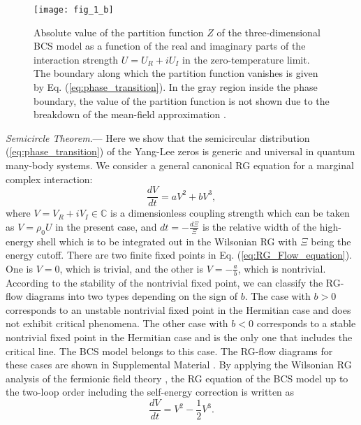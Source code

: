\documentclass[aps,prl,twocolumn,superscriptaddress]{revtex4-1}
\begin{document}
\begin{figure}
\texttt{[image: fig\_1\_b]}

\caption{Absolute value of the partition function $Z$ of the three-dimensional
BCS model as a function of the real and imaginary parts of the interaction
strength $U=U_{R}+iU_{I}$ in the zero-temperature limit. The boundary
along which the partition function vanishes is given by Eq. (\ref{eq:phase_transition}). In the gray region inside
the phase boundary, the value of the partition function is not shown
due to the breakdown of the mean-field approximation \cite{Yamamoto2019}.}

\label{Phase_transition_line}
\end{figure}

\emph{Semicircle Theorem}.---  Here we show that the semicircular
distribution (\ref{eq:phase_transition}) of the Yang-Lee zeros is generic and universal in quantum many-body systems.
We consider a general canonical RG equation for a marginal
complex interaction: 
\begin{equation}
\frac{dV}{dt}=aV^{2}+bV^{3},\label{eq:RG_Flow_equation}
\end{equation}
where $V=V_{R}+iV_{I}\in\mathbb{C}$ is a dimensionless coupling strength
which can be taken as $V=\rho_{0}U$ in the present case, and $dt=-\frac{d\Xi}{\Xi}$
is the relative width of the high-energy shell which is to be integrated out in the Wilsonian RG with $\Xi$ being the energy cutoff. There are two finite fixed points in Eq. (\ref{eq:RG_Flow_equation}). One is $V=0$, which is trivial, and the other is $V=-\frac{a}{b}$, which is nontrivial. According to the stability of the nontrivial
fixed point, we can classify the RG-flow diagrams into two types depending on the sign of $b$.
The case with $b>0$ corresponds to an unstable nontrivial fixed point
in the Hermitian case and does not exhibit critical phenomena. The
other case with $b<0$ corresponds to a stable nontrivial fixed point
in the Hermitian case and is the only one that includes the critical line. The BCS model belongs to this case.
The RG-flow diagrams for these cases are shown in Supplemental
Material \cite{SupplementaryMaterial}. By applying the Wilsonian RG analysis
of the fermionic field theory \cite{Shankar1994}, the RG equation of
the BCS model up to the two-loop order including the self-energy correction
is written as \cite{SupplementaryMaterial} 
\begin{equation}
\frac{dV}{dt}=V^{2}-\frac{1}{2}V^{3}.\label{eq:rg_equation}
\end{equation}
\end{document}
